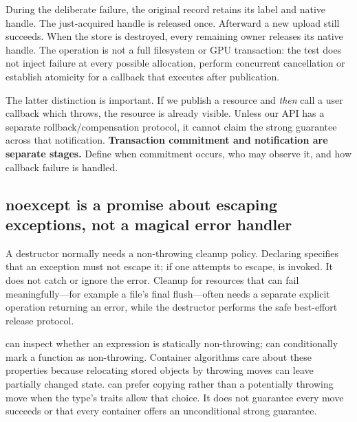 During the deliberate failure, the original record retains its label and native handle. The just-acquired handle is released once. Afterward a new upload still succeeds. When the store is destroyed, every remaining owner releases its native handle. The operation is not a full filesystem or GPU transaction: the test does not inject failure at every possible allocation, perform concurrent cancellation or establish atomicity for a callback that executes after publication.

The latter distinction is important. If we publish a resource and \emph{then} call a user callback which throws, the resource is already visible. Unless our API has a separate rollback/compensation protocol, it cannot claim the strong guarantee across that notification. \textbf{Transaction commitment and notification are separate stages.} Define when commitment occurs, who may observe it, and how callback failure is handled.

\subsection{noexcept is a promise about escaping exceptions, not a magical error handler}\label{05-engine-i-ch004-noexcept-is-a-promise-about-escaping-exceptions-not-a-magical-error-handler}

\hypertarget{05-engine-i-ch004-noexcept-is-a-promise-about-escaping-exceptions-not-a-magical-error-handler}{}

A destructor normally needs a non-throwing cleanup policy. Declaring  specifies that an exception must not escape it; if one attempts to escape,  is invoked. It does not catch or ignore the error. Cleanup for resources that can fail meaningfully---for example a file's final flush---often needs a separate explicit operation returning an error, while the destructor performs the safe best-effort release protocol.

 can inspect whether an expression is statically non-throwing;  can conditionally mark a function as non-throwing. Container algorithms care about these properties because relocating stored objects by throwing moves can leave partially changed state.  can prefer copying rather than a potentially throwing move when the type's traits allow that choice. It does not guarantee every move succeeds or that every container offers an unconditional strong guarantee.

